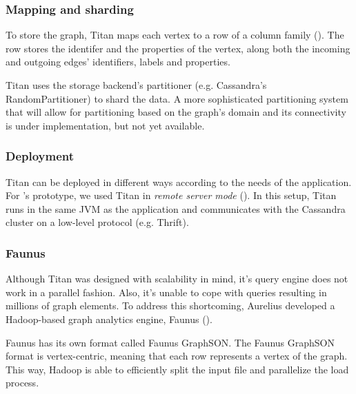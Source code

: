 \subsubsection{Mapping and sharding}

To store the graph, Titan maps each vertex to a row of a column family (). The row stores the identifer and the properties of the vertex, along both the incoming and outgoing edges' identifiers, labels and properties.

Titan uses the storage backend's partitioner (e.g. Cassandra's RandomPartitioner) to shard the data. A more sophisticated partitioning system that will allow for partitioning based on the graph's domain and its connectivity is under implementation, but not yet available.


\subsubsection{Deployment}

Titan can be deployed in different ways according to the needs of the application. For \iqd's prototype, we used Titan in \textit{remote server mode} (). In this setup, Titan runs in the same JVM as the application and communicates with the Cassandra cluster on a low-level protocol (e.g. Thrift).


\subsubsection{Faunus}

Although Titan was designed with scalability in mind, it's query engine does not work in a parallel fashion. Also, it's unable to cope with queries resulting in millions of graph elements. To address this shortcoming, Aurelius developed a Hadoop-based graph analytics engine, Faunus ().

Faunus has its own format called Faunus GraphSON. The Faunus GraphSON format is vertex-centric, meaning that each row represents a vertex of the graph. This way, Hadoop is able to efficiently split the input file and parallelize the load process.



